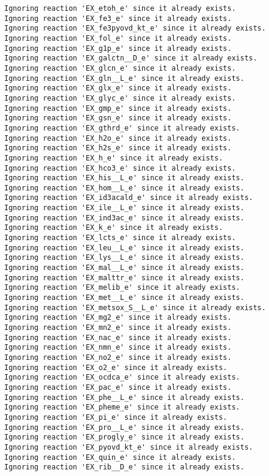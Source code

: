 \documentclass[
  letterpaper,
  DIV=11,
  numbers=noendperiod]{scrartcl}
\begin{document}
\begin{verbatim}
Ignoring reaction 'EX_etoh_e' since it already exists.
Ignoring reaction 'EX_fe3_e' since it already exists.
Ignoring reaction 'EX_fe3pyovd_kt_e' since it already exists.
Ignoring reaction 'EX_fol_e' since it already exists.
Ignoring reaction 'EX_g1p_e' since it already exists.
Ignoring reaction 'EX_galctn__D_e' since it already exists.
Ignoring reaction 'EX_glcn_e' since it already exists.
Ignoring reaction 'EX_gln__L_e' since it already exists.
Ignoring reaction 'EX_glx_e' since it already exists.
Ignoring reaction 'EX_glyc_e' since it already exists.
Ignoring reaction 'EX_gmp_e' since it already exists.
Ignoring reaction 'EX_gsn_e' since it already exists.
Ignoring reaction 'EX_gthrd_e' since it already exists.
Ignoring reaction 'EX_h2o_e' since it already exists.
Ignoring reaction 'EX_h2s_e' since it already exists.
Ignoring reaction 'EX_h_e' since it already exists.
Ignoring reaction 'EX_hco3_e' since it already exists.
Ignoring reaction 'EX_his__L_e' since it already exists.
Ignoring reaction 'EX_hom__L_e' since it already exists.
Ignoring reaction 'EX_id3acald_e' since it already exists.
Ignoring reaction 'EX_ile__L_e' since it already exists.
Ignoring reaction 'EX_ind3ac_e' since it already exists.
Ignoring reaction 'EX_k_e' since it already exists.
Ignoring reaction 'EX_lcts_e' since it already exists.
Ignoring reaction 'EX_leu__L_e' since it already exists.
Ignoring reaction 'EX_lys__L_e' since it already exists.
Ignoring reaction 'EX_mal__L_e' since it already exists.
Ignoring reaction 'EX_malttr_e' since it already exists.
Ignoring reaction 'EX_melib_e' since it already exists.
Ignoring reaction 'EX_met__L_e' since it already exists.
Ignoring reaction 'EX_metsox_S__L_e' since it already exists.
Ignoring reaction 'EX_mg2_e' since it already exists.
Ignoring reaction 'EX_mn2_e' since it already exists.
Ignoring reaction 'EX_nac_e' since it already exists.
Ignoring reaction 'EX_nmn_e' since it already exists.
Ignoring reaction 'EX_no2_e' since it already exists.
Ignoring reaction 'EX_o2_e' since it already exists.
Ignoring reaction 'EX_ocdca_e' since it already exists.
Ignoring reaction 'EX_pac_e' since it already exists.
Ignoring reaction 'EX_phe__L_e' since it already exists.
Ignoring reaction 'EX_pheme_e' since it already exists.
Ignoring reaction 'EX_pi_e' since it already exists.
Ignoring reaction 'EX_pro__L_e' since it already exists.
Ignoring reaction 'EX_progly_e' since it already exists.
Ignoring reaction 'EX_pyovd_kt_e' since it already exists.
Ignoring reaction 'EX_quin_e' since it already exists.
Ignoring reaction 'EX_rib__D_e' since it already exists.

\end{verbatim}
\end{document}
